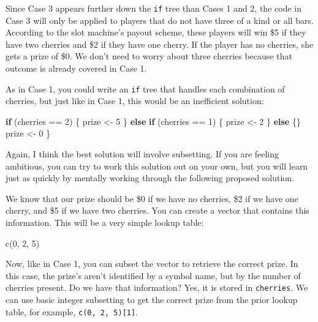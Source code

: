 \documentclass[
  letterpaper,
  DIV=11,
  numbers=noendperiod]{scrbook}
\newenvironment{Shaded}{\begin{snugshade}}{\end{snugshade}}
\newcommand{\ControlFlowTok}[1]{\textcolor[rgb]{0.00,0.23,0.31}{\textbf{#1}}}
\newcommand{\DecValTok}[1]{\textcolor[rgb]{0.68,0.00,0.00}{#1}}
\newcommand{\ErrorTok}[1]{\textcolor[rgb]{0.68,0.00,0.00}{#1}}
\newcommand{\FunctionTok}[1]{\textcolor[rgb]{0.28,0.35,0.67}{#1}}
\newcommand{\NormalTok}[1]{\textcolor[rgb]{0.00,0.23,0.31}{#1}}
\newcommand{\OtherTok}[1]{\textcolor[rgb]{0.00,0.23,0.31}{#1}}
\newcommand{\SpecialCharTok}[1]{\textcolor[rgb]{0.37,0.37,0.37}{#1}}
\begin{document}
Since Case 3 appears further down the \texttt{if} tree than Cases 1 and
2, the code in Case 3 will only be applied to players that do not have
three of a kind or all bars. According to the slot machine's payout
scheme, these players will win \$5 if they have two cherries and \$2 if
they have one cherry. If the player has no cherries, she gets a prize of
\$0. We don't need to worry about three cherries because that outcome is
already covered in Case 1.

As in Case 1, you could write an \texttt{if} tree that handles each
combination of cherries, but just like in Case 1, this would be an
inefficient solution:

\begin{Shaded}
\begin{Highlighting}[]
\ControlFlowTok{if}\NormalTok{ (cherries }\SpecialCharTok{==} \DecValTok{2}\NormalTok{) \{}
\NormalTok{  prize }\OtherTok{\textless{}{-}} \DecValTok{5}
\NormalTok{\} }\ControlFlowTok{else} \ControlFlowTok{if}\NormalTok{ (cherries }\SpecialCharTok{==} \DecValTok{1}\NormalTok{) \{}
\NormalTok{  prize }\OtherTok{\textless{}{-}} \DecValTok{2}
\NormalTok{\} }\ControlFlowTok{else}\NormalTok{ \{\}}
\NormalTok{  prize }\OtherTok{\textless{}{-}} \DecValTok{0}
\ErrorTok{\}}
\end{Highlighting}
\end{Shaded}

Again, I think the best solution will involve subsetting. If you are
feeling ambitious, you can try to work this solution out on your own,
but you will learn just as quickly by mentally working through the
following proposed solution.

We know that our prize should be \$0 if we have no cherries, \$2 if we
have one cherry, and \$5 if we have two cherries. You can create a
vector that contains this information. This will be a very simple lookup
table:

\begin{Shaded}
\begin{Highlighting}[]
\FunctionTok{c}\NormalTok{(}\DecValTok{0}\NormalTok{, }\DecValTok{2}\NormalTok{, }\DecValTok{5}\NormalTok{)}
\end{Highlighting}
\end{Shaded}

Now, like in Case 1, you can subset the vector to retrieve the correct
prize. In this case, the prize's aren't identified by a symbol name, but
by the number of cherries present. Do we have that information? Yes, it
is stored in \texttt{cherries}. We can use basic integer subsetting to
get the correct prize from the prior lookup table, for example,
\texttt{c(0,\ 2,\ 5){[}1{]}}.
\end{document}
